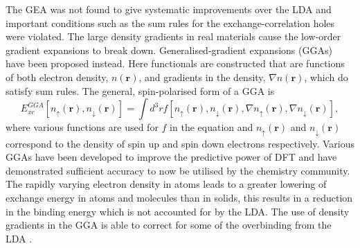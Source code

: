 \documentclass[11pt, twoside]{report}
\begin{document}
The GEA was not found to give systematic improvements over the LDA and important conditions such as the sum rules for the exchange-correlation holes were violated. The large density gradients in real materials cause the low-order gradient expansions to break down. 
Generalised-gradient expansions (GGAs) have been proposed instead.
Here functionals are constructed that are functions of both electron density, $n(\boldsymbol{r})$, and gradients in the density, $\nabla n(\boldsymbol{r})$, which do satisfy sum rules. The general, spin-polarised form of a GGA is 
\begin{equation}\label{GGA}
E_{xc}^{GGA}[ n_{\uparrow}(\mathbf{r}), n_{\downarrow}(\mathbf{r})] = \int d^3r f [ n_{\uparrow}(\mathbf{r}), n_{\downarrow}(\mathbf{r}), \nabla n_{\uparrow}(\mathbf{r}), \nabla n_{\downarrow}(\mathbf{r})],
\end{equation}
where various functions are used for $f$ in the equation and $n_{\uparrow}(\boldsymbol{r})$ and $n_{\downarrow}(\boldsymbol{r})$ correspond to the density of spin up and spin down electrons respectively.
Various GGAs have been developed to improve the predictive power of DFT and have demonstrated sufficient accuracy to now be utilised by the chemistry community.
The rapidly varying electron density in atoms leads to a greater lowering of exchange energy in atoms and molecules than in solids, this results in a reduction in the binding energy which is not accounted for by the LDA. The use of density gradients in the GGA is able to correct for some of the overbinding from the LDA \cite{RichardMartin_Ch8}. 

\end{document}

